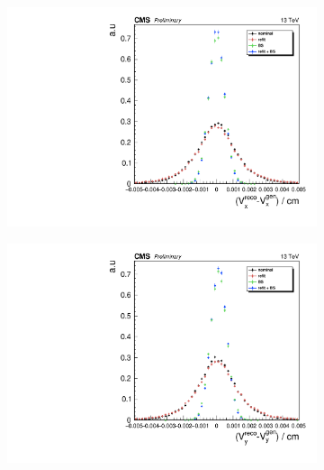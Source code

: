 \begin{figure}
  \begin{subfigure}[b]{0.33\linewidth}
    \centering
    \includegraphics[width=\linewidth]{Chapitre7/Images/PVx.pdf} 
    \caption{} 
    \vspace{0.5ex}
  \end{subfigure}%
  \begin{subfigure}[b]{0.33\linewidth}
    \centering
    \includegraphics[width=\linewidth]{Chapitre7/Images/PVy.pdf} 
    \caption{} 
    \vspace{0.5ex}
  \end{subfigure} 
    \begin{subfigure}[b]{0.33\linewidth}
    \centering

\end{subfigure}
\end{figure}
